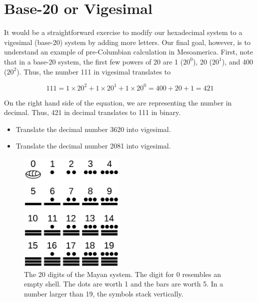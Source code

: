 \documentclass[12pt]{article}
\begin{document}
\section{Base-20 or Vigesimal}

It would be a straightforward exercise to modify our hexadecimal system to a vigesimal (base-20) system by adding more letters.  Our final goal, however, is to understand an example of pre-Columbian calculation in Mesoamerica.  First, note that in a base-20 system, the first few powers of 20 are 1 ($20^0$), 20 ($20^1$), and 400 ($20^2$). Thus, the number 111 in vigesimal translates to

\begin{equation}
111 = 1 \times 20^2 + 1\times 20^1 + 1\times 20^0 = 400 + 20 + 1 = 421
\end{equation}

On the right hand side of the equation, we are representing the number in decimal.  Thus, 421 in decimal translates to 111 in binary.

\begin{itemize}
\item Translate the decimal number 3620 into vigesimal. \\ \vspace{1cm}
\item Translate the decimal number 2081 into vigesimal. \\ \vspace{1cm}
\end{itemize}

\begin{figure}[hb]
\centering
\includegraphics[width=5cm]{figures/maya_digits.png}
\caption{\label{fig:maya} The 20 digits of the Mayan system.  The digit for 0 resembles an empty shell.  The dots are worth 1 and the bars are worth 5.  In a number larger than 19, the symbols stack vertically.}
\end{figure}
\end{document}
